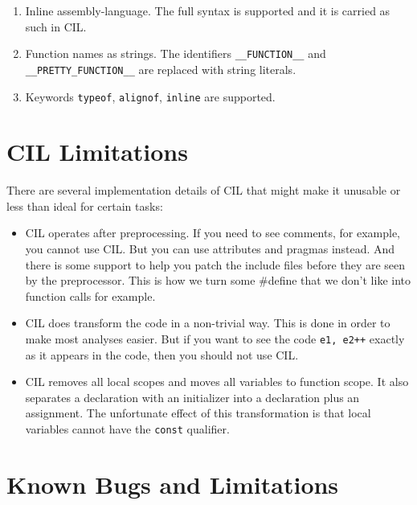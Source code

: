 \documentclass{article}
\def\t#1{{\tt #1}}
\begin{document}
\begin{enumerate}
\item Inline assembly-language. The full syntax is supported and it is carried
as such in CIL.

\item Function names as strings. The identifiers \t{\_\_FUNCTION\_\_} and
\t{\_\_PRETTY\_FUNCTION\_\_} are replaced with string literals. 

\item Keywords \t{typeof}, \t{alignof}, \t{inline} are supported. 
\end{enumerate}

\section{CIL Limitations}

 There are several implementation details of CIL that might make it unusable
 or less than ideal for certain tasks:

\begin{itemize}
\item CIL operates after preprocessing. If you need to see comments, for
example, you cannot use CIL. But you can use attributes and pragmas instead.
And there is some support to help you patch the include files before they are
seen by the preprocessor. This is how we turn some #define that we don't like
into function calls for example. 

\item CIL does transform the code in a non-trivial way. This is done in order
to make most analyses easier. But if you want to see the code \t{e1, e2++}
exactly as it appears in the code, then you should not use CIL. 

\item CIL removes all local scopes and moves all variables to function
scope. It also separates a declaration with an initializer into a declaration
plus an assignment. The unfortunate effect of this transformation is that
local variables cannot have the \t{const} qualifier.

\end{itemize}
 
\section{Known Bugs and Limitations}
\end{document}
